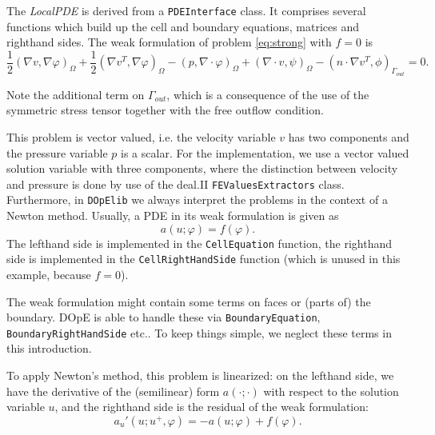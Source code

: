 \vspace{0.2cm}

The \textit{LocalPDE} is derived from a \texttt{PDEInterface} class. It comprises several functions which build up the cell and boundary equations, matrices and righthand sides. The weak formulation of problem \eqref{eq:strong} with $f=0$ is
\begin{equation} \label{eq:weak}
   \frac{1}{2}(\nabla v, \nabla \varphi)_\Omega + \frac{1}{2}(\nabla v^{T}, \nabla \varphi)_\Omega - (p, \nabla \cdot \varphi)_\Omega + (\nabla \cdot v, \psi)_\Omega - (n\cdot \nabla v^T,\phi)_{\Gamma_{out}} = 0.
\end{equation}
\begin{remark}
Note the additional term on $\Gamma_{out}$, which is a consequence of the use of the symmetric stress tensor together with the free outflow condition.
\end{remark}
This problem is vector valued, i.e. the velocity variable $v$ has two components and the pressure variable $p$ is a scalar. For the implementation, we use a vector valued solution variable with three components, where the distinction between velocity and pressure is done by use of the deal.II \texttt{FEValuesExtractors} class. \\
Furthermore, in \texttt{DOpElib} we always interpret the problems in the context of a Newton method. Usually, a PDE in its weak formulation is given as
\begin{equation*}
   a(u;\varphi) = f(\varphi).
\end{equation*}
The lefthand side is implemented in the \texttt{CellEquation} function, the righthand side is implemented in the \texttt{CellRightHandSide} function (which is unused in this example, because $f=0$).
\begin{remark}
The weak formulation might contain some terms on faces or (parts of) the boundary. DOpE is able to handle these via \texttt{BoundaryEquation}, \texttt{BoundaryRightHandSide} etc.. To keep things simple, we neglect these terms in this introduction.
\end{remark}
To apply Newton's method, this problem is linearized: on the lefthand side, we have the derivative of the (semilinear) form $a(\cdot;\cdot)$ with respect to the solution variable $u$, and the righthand side is the residual of the weak formulation:
\begin{equation*}
   a_u'(u;u^+,\varphi) = -a(u;\varphi) + f(\varphi).
\end{equation*}

